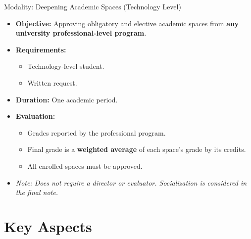         \begin{frame}{Modality: Deepening Academic Spaces (Technology Level)}
          \begin{itemize}
            \item<1-> \textbf{Objective:} Approving obligatory and elective academic spaces from \textbf{any university professional-level program}.
            \item<2-> \textbf{Requirements:}
              \begin{itemize}
                \item<3-> Technology-level student.
                \item<4-> Written request.
              \end{itemize}
            \item<5-> \textbf{Duration:} One academic period.
            \item<6-> \textbf{Evaluation:}
              \begin{itemize}
                \item<7-> Grades reported by the professional program.
                \item<8-> Final grade is a \textbf{weighted average} of each space's grade by its credits.
                \item<9-> All enrolled spaces must be approved.
              \end{itemize}
            \item<10-> \textit{Note: Does not require a director or evaluator. Socialization is considered in the final note.}
          \end{itemize}
        \end{frame}

        \section{Key Aspects}


